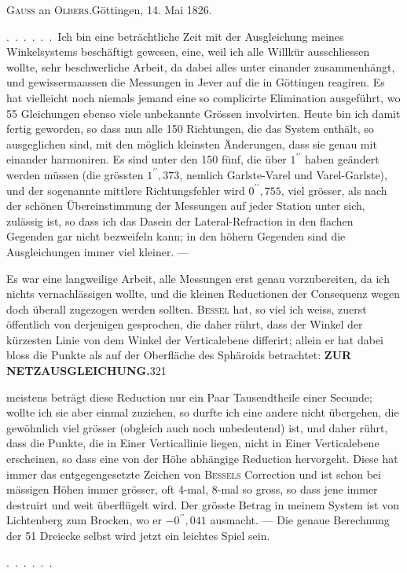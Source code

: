 \begin{center}\textsc{Gauss} an \textsc{Olbers}.\quad Göttingen, 14. Mai 1826.\end{center}

.\ .\ .\ .\ .\ .\ Ich bin eine beträchtliche Zeit mit der Ausgleichung meines
Winkelsystems beschäftigt gewesen, eine, weil ich alle Willkür ausschliessen
wollte, sehr beschwerliche Arbeit, da dabei alles unter einander zusammenhängt,
und gewissermaassen die Messungen in Jever auf die in Göttingen
reagiren. Es hat vielleicht noch niemals jemand eine so complicirte Elimination
ausgeführt, wo 55 Gleichungen ebenso viele unbekannte Grössen involvirten.
Heute bin ich damit fertig geworden, so dass nun alle 150 Richtungen,
die das System enthält, so ausgeglichen sind, mit den möglich kleinsten
Änderungen, dass sie genau mit einander harmoniren. Es sind unter den
150 fünf, die über $1^{\prime\prime}$ haben geändert werden müssen (die grössten $1^{\prime\prime}{,}373$,
nemlich Garlste-Varel und Varel-Garlste), und der sogenannte mittlere Richtungsfehler
wird $0^{\prime\prime}{,}755$, viel grösser, als nach der schönen Übereinstimmung
der Messungen auf jeder Station unter sich, zulässig ist, so dass ich das
Dasein der Lateral-Refraction in den flachen Gegenden gar nicht bezweifeln
kann; in den höhern Gegenden sind die Ausgleichungen immer viel kleiner. ---

Es war eine langweilige Arbeit, alle Messungen erst genau vorzubereiten,
da ich nichts vernachlässigen wollte, und die kleinen Reductionen der Consequenz
wegen doch überall zugezogen werden sollten. \textsc{Bessel} hat, so viel ich
weiss, zuerst öffentlich von derjenigen gesprochen, die daher rührt, dass der
Winkel der kürzesten Linie von dem Winkel der Verticalebene differirt; allein
er hat dabei bloss die Punkte als auf der Oberfläche des Sphäroids betrachtet:
\clearpage
\noindent\textbf{ZUR NETZAUSGLEICHUNG.}\hfill321\par\medskip
\noindent meistens beträgt diese Reduction nur ein Paar Tausendtheile einer Secunde;
wollte ich sie aber einmal zuziehen, so durfte ich eine andere nicht übergehen,
die gewöhnlich viel grösser (obgleich auch noch unbedeutend) ist, und
daher rührt, dass die Punkte, die in Einer Verticallinie liegen, nicht in Einer
Verticalebene erscheinen, so dass eine von der Höhe abhängige Reduction
hervorgeht. Diese hat immer das entgegengesetzte Zeichen von \textsc{Bessels} Correction
und ist schon bei mässigen Höhen immer grösser, oft 4-mal, 8-mal
so gross, so dass jene immer destruirt und weit überflügelt wird. Der grösste
Betrag in meinem System ist von Lichtenberg zum Brocken, wo er $-0^{\prime\prime}{,}041$
ausmacht. --- Die genaue Berechnung der 51 Dreiecke selbst wird jetzt ein
leichtes Spiel sein.
\par\medskip
.\ .\ .\ .\ .\ .

